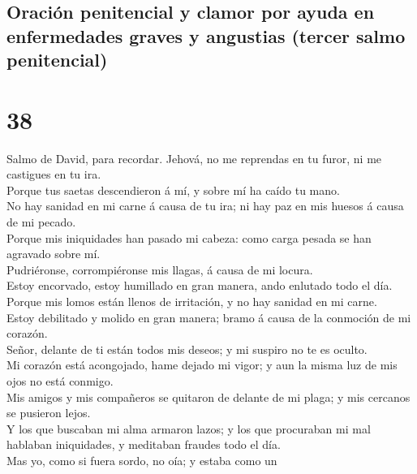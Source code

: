 \hypertarget{oraciuxf3n-penitencial-y-clamor-por-ayuda-en-enfermedades-graves-y-angustias-tercer-salmo-penitencial}{%
\subsection{Oración penitencial y clamor por ayuda en enfermedades
graves y angustias (tercer salmo
penitencial)}\label{oraciuxf3n-penitencial-y-clamor-por-ayuda-en-enfermedades-graves-y-angustias-tercer-salmo-penitencial}}

\hypertarget{section-19-38}{%
\section{38}\label{section-19-38}}

 Salmo de David, para recordar. Jehová, no me reprendas en
tu furor, ni me castigues en tu ira.\\
 Porque tus saetas descendieron á mí, y sobre mí ha caído
tu mano.\\
 No hay sanidad en mi carne á causa de tu ira; ni hay paz
en mis huesos á causa de mi pecado.\\
 Porque mis iniquidades han pasado mi cabeza: como carga
pesada se han agravado sobre mí.\\
 Pudriéronse, corrompiéronse mis llagas, á causa de mi
locura.\\
 Estoy encorvado, estoy humillado en gran manera, ando
enlutado todo el día.\\
 Porque mis lomos están llenos de irritación, y no hay
sanidad en mi carne.\\
 Estoy debilitado y molido en gran manera; bramo á causa
de la conmoción de mi corazón.\\
 Señor, delante de ti están todos mis deseos; y mi suspiro
no te es oculto.\\
 Mi corazón está acongojado, hame dejado mi vigor; y aun
la misma luz de mis ojos no está conmigo.\\
 Mis amigos y mis compañeros se quitaron de delante de mi
plaga; y mis cercanos se pusieron lejos.\\
 Y los que buscaban mi alma armaron lazos; y los que
procuraban mi mal hablaban iniquidades, y meditaban fraudes todo el
día.\\
 Mas yo, como si fuera sordo, no oía; y estaba como un

